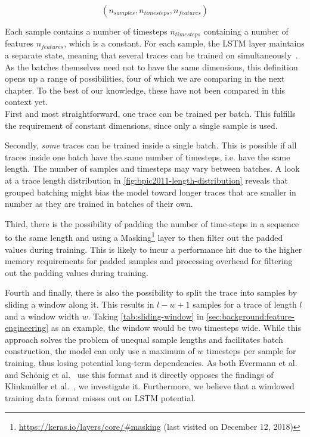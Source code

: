 $$(n_{samples}, n_{timesteps}, n_{features})$$

Each sample contains a number of timesteps $n_{timesteps}$ containing a number of features $n_{features}$, which is a constant. For each sample, the LSTM layer maintains a separate state, meaning that several traces can be trained on simultaneously~\cite{web:keras-lstm-state}. As the batches themselves need not to have the same dimensions, this definition opens up a range of possibilities, four of which we are comparing in the next chapter. To the best of our knowledge, these have not been compared in this context yet.\\

First and most straightforward, one trace can be trained per batch. This fulfills the requirement of constant dimensions, since only a single sample is used.

Secondly, \textit{some} traces can be trained inside a single batch. This is possible if all traces inside one batch have the same number of timesteps, i.e. have the same length. The number of samples and timesteps may vary between batches. A look at a trace length distribution in \autoref{fig:bpic2011-length-distribution} reveals that grouped batching might bias the model toward longer traces that are smaller in number as they are trained in batches of their own.

Third, there is the possibility of padding the number of time-steps in a sequence to the same length and using a Masking\footnote{\url{https://keras.io/layers/core/\#masking} (last visited on December 12, 2018)} layer to then filter out the padded values during training. This is likely to incur a performance hit due to the higher memory requirements for padded samples and processing overhead for filtering out the padding values during training.

Fourth and finally, there is also the possibility to split the trace into samples by sliding a window along it. This results in $l-w+1$ samples for a trace of length $l$ and a window width $w$. Taking \autoref{tab:sliding-window} in \autoref{sec:background:feature-engineering} as an example, the window would be two timesteps wide. While this approach solves the problem of unequal sample lengths and facilitates batch construction, the model can only use a maximum of $w$ timesteps per sample for training, thus losing potential long-term dependencies. As both Evermann et al.~\cite{evermann2016} and Schönig et al.~\cite{schoenig2018} use this format and it directly opposes the findings of Klinkmüller et al.~\cite{klinkmuller2018reliablemonitoring}, we investigate it. Furthermore, we believe that a windowed training data format misses out on LSTM potential.\\

